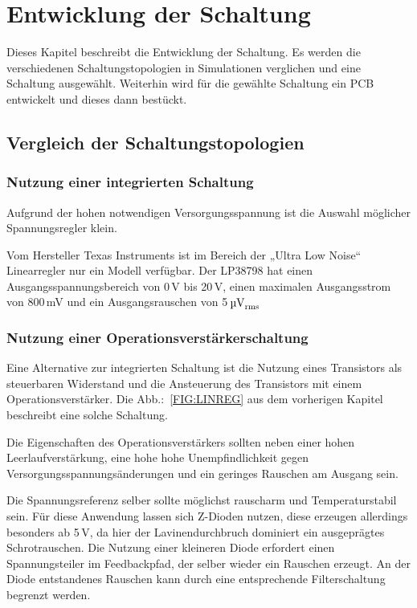 \chapter{Entwicklung der Schaltung}
Dieses Kapitel beschreibt die Entwicklung der Schaltung.
Es werden die verschiedenen Schaltungstopologien in Simulationen 
verglichen und eine Schaltung ausgewählt.
Weiterhin wird für die gewählte Schaltung ein PCB entwickelt und dieses dann
bestückt.

\section{Vergleich der Schaltungstopologien}
\subsection{Nutzung einer integrierten Schaltung}
Aufgrund der hohen notwendigen Versorgungsspannung ist die Auswahl möglicher 
Spannungsregler klein.

Vom Hersteller Texas Instruments ist im Bereich der „Ultra Low Noise“ 
Linearregler nur ein Modell verfügbar.
Der LP38798 hat einen Ausgangsspannungsbereich von 0\,\si{\volt} bis
20\,\si{\volt}, einen maximalen Ausgangsstrom von 800\,\si{\milli\volt} und
ein Ausgangsrauschen von 5\,$\si{\micro\volt}_{\rm rms}$

\subsection{Nutzung einer Operationsverstärkerschaltung}
Eine Alternative zur integrierten Schaltung ist die Nutzung eines 
Transistors als steuerbaren Widerstand und die Ansteuerung des Transistors
mit einem Operationsverstärker.
Die Abb.:~\ref{FIG:LINREG} aus dem vorherigen Kapitel beschreibt eine solche 
Schaltung.

Die Eigenschaften des Operationsverstärkers sollten neben einer hohen 
Leerlaufverstärkung, eine hohe hohe Unempfindlichkeit gegen 
Versorgungsspannungsänderungen und ein geringes Rauschen am Ausgang sein.

Die Spannungsreferenz selber sollte möglichst rauscharm und Temperaturstabil 
sein.
Für diese Anwendung lassen sich Z-Dioden nutzen, diese erzeugen allerdings 
besonders ab 5\,V, da hier der Lavinendurchbruch dominiert ein ausgeprägtes
Schrotrauschen. Die Nutzung einer kleineren Diode erfordert einen 
Spannungsteiler im Feedbackpfad, der selber wieder ein Rauschen erzeugt.
An der Diode entstandenes Rauschen kann durch eine entsprechende 
Filterschaltung begrenzt werden.

